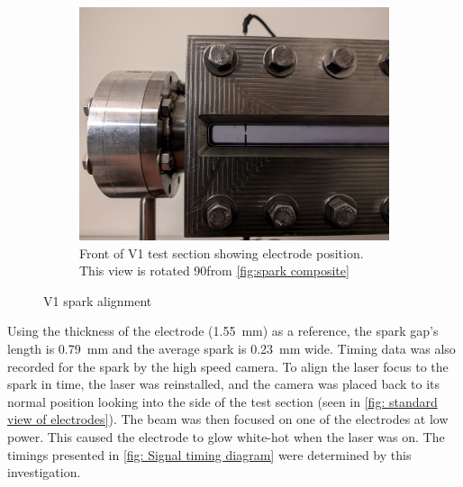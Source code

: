 \begin{figure}[!ht]
\begin{subfigure}[t]{0.25\textwidth}
                    \label{fig:spark composite}
                \end{subfigure}
                \hfill
                \begin{subfigure}[t]{0.45\textwidth}
                    \centering
                    \includegraphics[width=\textwidth]{assets/4 experiments/V1 opposing electrodes.jpg}
                    \caption{Front of V1 test section showing electrode position. This view is rotated 90\degree from \autoref{fig:spark composite}}
                    \label{fig: standard view of electrodes}
                \end{subfigure}
                \caption{V1 spark alignment}
            \end{figure}
            
            Using the thickness of the electrode (\qty{1.55}{mm}) as a reference, the spark gap's length is \qty{0.79}{mm} and the average spark is \qty{0.23}{mm} wide. Timing data was also recorded for the spark by the high speed camera. To align the laser focus to the spark in time, the laser was reinstalled, and the camera was placed back to its normal position looking into the side of the test section (seen in \autoref{fig: standard view of electrodes}). The beam was then focused on one of the electrodes at low power. This caused the electrode to glow white-hot when the laser was on. The timings presented in \autoref{fig: Signal timing diagram} were determined by this investigation.

